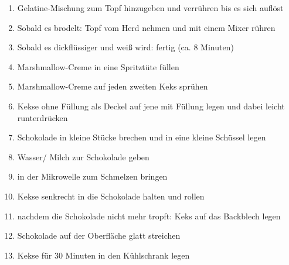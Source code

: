 \begin{enumerate}[noitemsep]
	\item Gelatine-Mischung zum Topf hinzugeben und verrühren bis es sich auflöst 
	\item Sobald es brodelt: Topf vom Herd nehmen und mit einem Mixer rühren
	\item Sobald es dickflüssiger und weiß wird: fertig (ca. 8 Minuten)
	\item Marshmallow-Creme in eine Spritztüte füllen
	\item Marshmallow-Creme auf jeden zweiten Keks sprühen
	\item Kekse ohne Füllung als Deckel auf jene mit Füllung legen und dabei leicht runterdrücken
	\vspace{0.5cm}
	\item  Schokolade in kleine Stücke brechen und in eine kleine Schüssel legen
	\item Wasser/ Milch zur Schokolade geben
	\item in der Mikrowelle zum Schmelzen bringen
	\item Kekse senkrecht in die Schokolade halten und rollen
	\item nachdem die Schokolade nicht mehr tropft: Keks auf das Backblech legen
	\item Schokolade auf der Oberfläche glatt streichen
	\item Kekse für 30 Minuten in den Kühlschrank legen
\end{enumerate}